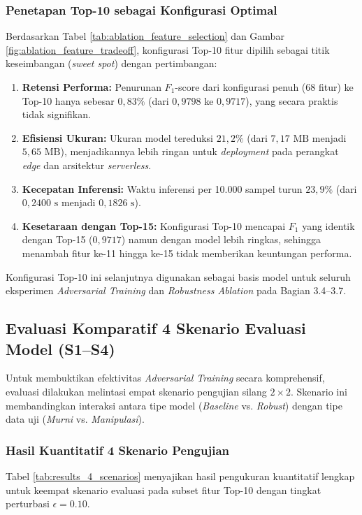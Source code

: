 \documentclass[11pt, a4paper]{article}
\begin{document}
\subsubsection{Penetapan Top-10 sebagai Konfigurasi Optimal}
Berdasarkan Tabel \ref{tab:ablation_feature_selection} dan Gambar \ref{fig:ablation_feature_tradeoff}, konfigurasi Top-10 fitur dipilih sebagai titik keseimbangan (\textit{sweet spot}) dengan pertimbangan:
\begin{enumerate}
    \item \textbf{Retensi Performa:} Penurunan $F_1$-score dari konfigurasi penuh (68 fitur) ke Top-10 hanya sebesar $0{,}83\%$ (dari $0{,}9798$ ke $0{,}9717$), yang secara praktis tidak signifikan.
    \item \textbf{Efisiensi Ukuran:} Ukuran model tereduksi $21{,}2\%$ (dari $7{,}17\text{ MB}$ menjadi $5{,}65\text{ MB}$), menjadikannya lebih ringan untuk \textit{deployment} pada perangkat \textit{edge} dan arsitektur \textit{serverless}.
    \item \textbf{Kecepatan Inferensi:} Waktu inferensi per 10.000 sampel turun $23{,}9\%$ (dari $0{,}2400\text{ s}$ menjadi $0{,}1826\text{ s}$).
    \item \textbf{Kesetaraan dengan Top-15:} Konfigurasi Top-10 mencapai $F_1$ yang identik dengan Top-15 ($0{,}9717$) namun dengan model lebih ringkas, sehingga menambah fitur ke-11 hingga ke-15 tidak memberikan keuntungan performa.
\end{enumerate}

Konfigurasi Top-10 ini selanjutnya digunakan sebagai basis model untuk seluruh eksperimen \textit{Adversarial Training} dan \textit{Robustness Ablation} pada Bagian 3.4--3.7.


\subsection{Evaluasi Komparatif 4 Skenario Evaluasi Model (S1--S4)}
Untuk membuktikan efektivitas \textit{Adversarial Training} secara komprehensif, evaluasi dilakukan melintasi empat skenario pengujian silang $2\times 2$. Skenario ini membandingkan interaksi antara tipe model (\textit{Baseline} vs. \textit{Robust}) dengan tipe data uji (\textit{Murni} vs. \textit{Manipulasi}).

\subsubsection{Hasil Kuantitatif 4 Skenario Pengujian}
Tabel \ref{tab:results_4_scenarios} menyajikan hasil pengukuran kuantitatif lengkap untuk keempat skenario evaluasi pada subset fitur Top-10 dengan tingkat perturbasi $\epsilon = 0.10$.
\end{document}
